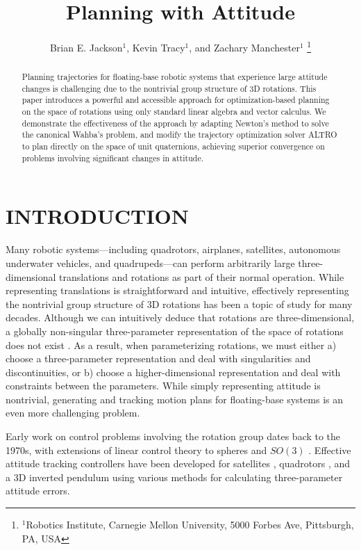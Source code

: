 \documentclass[letterpaper, 10 pt, conference]{ieeeconf}  %
\title{\LARGE \bf
Planning with Attitude
}
\author{Brian E. Jackson$^1$, Kevin Tracy$^1$, and Zachary Manchester$^1$%
    \thanks{
        $^1$Robotics Institute, 
        Carnegie Mellon University, 
        5000 Forbes Ave, Pittsburgh, PA, USA
    }
}
\begin{document}
\maketitle

\begin{abstract}
Planning trajectories for floating-base robotic systems that experience large
attitude changes is challenging due to the nontrivial group structure of 3D
rotations. This paper introduces a powerful and accessible approach for
optimization-based planning on the space of rotations using only standard
linear algebra and vector calculus. We demonstrate the effectiveness of the
approach by adapting Newton's method to solve the canonical Wahba's problem,
and modify the trajectory optimization solver ALTRO to plan directly on the
space of unit quaternions, achieving superior convergence on problems
involving significant changes in attitude.

\end{abstract}

\section{INTRODUCTION}

    Many robotic systems---including quadrotors, airplanes, satellites, autonomous
    underwater vehicles, and quadrupeds---can perform arbitrarily large three-dimensional
    translations and rotations as part of their normal operation. While representing
    translations is straightforward and intuitive, effectively representing the
    nontrivial group structure of 3D rotations has been a topic of study for many
    decades. Although we can intuitively deduce that rotations are three-dimensional, a
    globally non-singular three-parameter representation of the space of rotations does
    not exist \cite{stuelpnagel1964parametrization}. As a result, when parameterizing
    rotations, we must either a) choose a three-parameter representation and deal with
    singularities and discontinuities, or b) choose a higher-dimensional representation and deal with
    constraints between the parameters. While simply representing attitude is nontrivial,
    generating and tracking motion plans for floating-base systems is an even more
    challenging problem.

    Early work on control problems involving the rotation group dates back to the 1970s,
    with extensions of linear control theory to spheres \cite{Brockett1973} and $SO(3)$
    \cite{Baillieul1978}. Effective attitude tracking controllers have been developed for
    satellites \cite{wie1985quaternion}, quadrotors
    \cite{Fresk2013,Liu2015,lee2010geometric,
    Johnson2005,watterson2020control,mellinger2011minimum}, and a 3D inverted pendulum
    \cite{Chaturvedi2009} using various methods for calculating three-parameter attitude
    errors.
\end{document}
